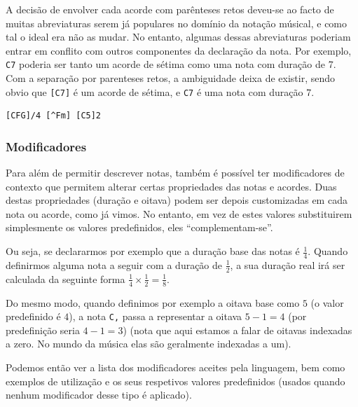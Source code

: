 A decisão de envolver cada acorde com parênteses retos deveu-se ao facto de muitas abreviaturas serem já populares no domínio da notação músical, e como tal o ideal era não as mudar. No entanto, algumas dessas abreviaturas poderiam entrar em conflito com outros componentes da declaração da nota. Por exemplo, \texttt{C7} poderia ser tanto um acorde de sétima como uma nota com duração de 7. Com a separação por parenteses retos, a ambiguidade deixa de existir, sendo obvio que \texttt{[C7]} é um acorde de sétima, e \texttt{C7} é uma nota com duração 7.

\begin{lstlisting}[caption={Exemplos de três definições de acordes possíveis}] 
[CFG]/4 [^Fm] [C5]2
\end{lstlisting}

\subsubsection{\textbf{Modificadores}}

Para além de permitir descrever notas, também é possível ter modificadores de contexto que permitem alterar certas propriedades das notas e acordes. Duas destas propriedades (duração e oitava) podem ser depois customizadas em cada nota ou acorde, como já vimos. No entanto, em vez de estes valores substituirem simplesmente os valores predefinidos, eles ``complementam-se''.

Ou seja, se declararmos por exemplo que a duração base das notas é $\frac{1}{4}$. Quando definirmos alguma nota a seguir com a duração de $\frac{1}{2}$, a sua duração real irá ser calculada da seguinte forma $\frac{1}{4} \times \frac{1}{2} = \frac{1}{8}$.

Do mesmo modo, quando definimos por exemplo a oitava base como $5$ (o valor predefinido é $4$), a nota \texttt{C,} passa a representar a oitava $5 - 1 = 4$ (por predefinição seria $4 - 1 = 3$) (nota que aqui estamos a falar de oitavas indexadas a zero. No mundo da música elas são geralmente indexadas a um).

Podemos então ver a lista dos modificadores aceites pela linguagem, bem como exemplos de utilização e os seus respetivos valores predefinidos (usados quando nenhum modificador desse tipo é aplicado).

